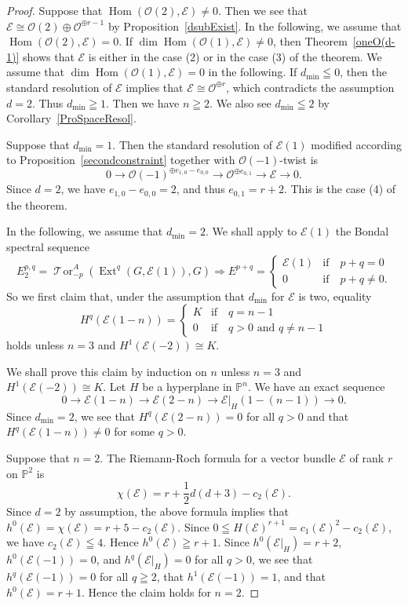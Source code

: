 \documentclass[a4paper,12pt]{amsart}
\DeclareMathOperator{\Hom}{Hom}
\DeclareMathOperator{\Ext}{Ext}
\newcommand{\caltor}{\mathop{{\mathcal T\!or}}\nolimits}
\begin{document}
\begin{proof}
Suppose that $\Hom(\mathcal{O}(2),\mathcal{E})\neq 0$.
Then we see that $\mathcal{E}\cong \mathcal{O}(2)\oplus\mathcal{O}^{\oplus r-1}$
by Proposition~\ref{dsubExist}.
In the following, we assume that $\Hom(\mathcal{O}(2),\mathcal{E})=0$.
If 
$\dim \Hom(\mathcal{O}(1),\mathcal{E})\neq 0$,
then Theorem~\ref{oneO(d-1)} shows that 
$\mathcal{E}$ is either in the case (2) or in the case (3) of the theorem.
We assume that 
$\dim \Hom(\mathcal{O}(1),\mathcal{E})=0$ 
in the following.
If $d_{\min}\leqq 0$, then the standard resolution of $\mathcal{E}$ implies that 
$\mathcal{E}\cong \mathcal{O}^{\oplus r}$,
which contradicts the assumption $d=2$.
Thus $d_{\min}\geqq 1$.
Then we have $n\geqq 2$.
We also see $d_{\min}\leqq 2$ by Corollary~\ref{ProSpaceResol}.

Suppose that $d_{\min}=1$.
Then the standard resolution of $\mathcal{E}(1)$ modified according to Proposition~\ref{secondconstraint} together with $\mathcal{O}(-1)$-twist 
is 
\[0\to\mathcal{O}(-1)^{\oplus e_{1,0}-e_{0,0}}\to\mathcal{O}^{\oplus e_{0,1}}\to \mathcal{E}\to 0.\]
Since $d=2$, we have $e_{1,0}-e_{0,0}=2$, and thus $e_{0,1}=r+2$. This is the case (4) of the theorem.

In the following, we assume that $d_{\min}=2$. 
We shall apply to $\mathcal{E}(1)$ the Bondal spectral sequence \cite[Theorem 1]{MR3275418}
\[
E_2^{p,q}=\caltor_{-p}^A(\Ext^q(G,\mathcal{E}(1)),G)
\Rightarrow
E^{p+q}=
\begin{cases}
\mathcal{E}(1)& \textrm{if}\quad  p+q= 0\\
0& \textrm{if}\quad  p+q\neq 0.
\end{cases}
\]
So 
we first claim that, under the assumption that $d_{\min}$ for $\mathcal{E}$ is two, equality
\[H^q(\mathcal{E}(1-n))=
\begin{cases}
K& \textrm{if}\quad  q= n-1\\
0& \textrm{if}\quad  q>0\textrm{ and }q\neq n-1
\end{cases}
\]
holds unless $n=3$ and $H^1(\mathcal{E}(-2))\cong K$.

We shall prove this claim by induction on $n$
unless $n=3$ and $H^1(\mathcal{E}(-2))\cong K$.
Let $H$ be a hyperplane in $\mathbb{P}^n$.
We have an exact sequence
\[
0\to \mathcal{E}(1-n)\to \mathcal{E}(2-n)\to \mathcal{E}|_H(1-(n-1))\to 0.
\]
Since $d_{\min}=2$, we see that $H^q(\mathcal{E}(2-n))=0$ for all $q>0$
and that $H^q(\mathcal{E}(1-n))\neq 0$ for some $q>0$.

Suppose that $n=2$.
The Riemann-Roch formula for a vector bundle $\mathcal{E}$ of rank $r$ on $\mathbb{P}^2$
is
\[\chi(\mathcal{E}
)=
r+\frac{1}{2}d(d+3)
-c_2(\mathcal{E}).\]
Since $d=2$ by assumption, 
the above formula 
implies that 
$h^0(\mathcal{E})=\chi(\mathcal{E})=r+5-c_2(\mathcal{E})$.
Since $0\leqq H(\mathcal{E})^{r+1}=c_1(\mathcal{E})^2-c_2(\mathcal{E})$, we have $c_2(\mathcal{E})\leqq 4$.
Hence 
$h^0(\mathcal{E})
\geqq
r+1$.
Since $h^0(\mathcal{E}|_H)=r+2$, $h^0(\mathcal{E}(-1))=0$, and $h^q(\mathcal{E}|_H)=0$ for all $q>0$,
we see that $h^q(\mathcal{E}(-1))=0$ for all $q\geqq 2$,
that $h^1(\mathcal{E}(-1))=1$, and that $h^0(\mathcal{E})=r+1$.
Hence the claim holds for $n=2$.


\end{proof}
\end{document}
